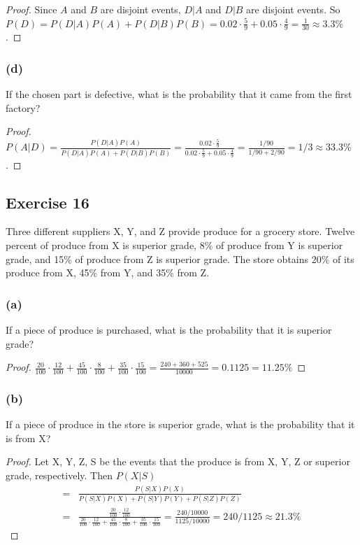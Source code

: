 \documentclass[14pt]{extarticle}
\newcommand{\dps}{\displaystyle}
\begin{document}
\begin{proof}
Since \(A\) and \(B\) are disjoint events, \(D|A\) and \(D|B\) are disjoint events. So \(P(D) = P(D|A)P(A) + P(D|B)P(B) = 
0.02 \cdot \frac{5}{9} + 0.05 \cdot \frac{4}{9} = \frac{1}{30} \approx 3.3\%\).
\end{proof}

\subsubsection{(d)}
If the chosen part is defective, what is the probability that it came from the first factory?

\begin{proof}
\(P(A|D) = \frac{P(D|A)P(A)}{P(D|A)P(A) + P(D|B)P(B)} = \frac{0.02 \cdot \frac{5}{9}}{0.02 \cdot \frac{5}{9} + 0.05 
\cdot \frac{4}{9}} = \frac{1/90}{1/90 + 2/90} = 1/3 \approx 33.3\%\).
\end{proof}

\subsection{Exercise 16}
Three different suppliers X, Y, and Z provide produce for a grocery store. Twelve percent of produce from X is superior 
grade, 8\% of produce from Y is superior grade, and 15\% of produce from Z is superior grade. The store obtains 20\% of 
its produce from X, 45\% from Y, and 35\% from Z.

\subsubsection{(a)}
If a piece of produce is purchased, what is the probability that it is superior grade?

\begin{proof}
\(\dps \frac{20}{100} \cdot \frac{12}{100} + \frac{45}{100} \cdot \frac{8}{100} + \frac{35}{100} \cdot \frac{15}{100} = 
\frac{240+360+525}{10000} = 0.1125 = 11.25\%\)
\end{proof}

\subsubsection{(b)}
If a piece of produce in the store is superior grade, what is the probability that it is from X?

\begin{proof}
Let X, Y, Z, S be the events that the produce is from X, Y, Z or superior grade, respectively. Then \(P(X|S)\)
\[
\begin{array}{cl}
= & \dps \frac{P(S|X)P(X)}{P(S|X)P(X) + P(S|Y)P(Y) + P(S|Z)P(Z)} \\
= & \dps \frac{\frac{20}{100} \cdot \frac{12}{100}}
{\frac{20}{100} \cdot \frac{12}{100} + \frac{45}{100} \cdot \frac{8}{100} + \frac{35}{100} \cdot \frac{15}{100}}
= \dps \frac{240/10000}{1125/10000} = 240/1125 \approx 21.3\%
\end{array}
\]
\end{proof}
\end{document}
